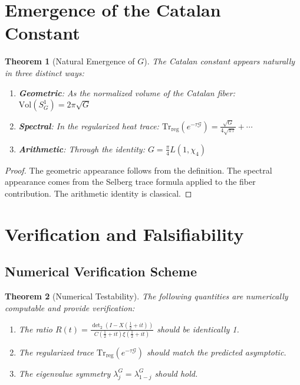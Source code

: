 \documentclass[11pt]{article}
\theoremstyle{plain}
\newtheorem{theorem}{Theorem}[section]
\theoremstyle{remark}
\newcommand{\Vol}{\mathrm{Vol}}
\newcommand{\Tr}{\mathrm{Tr}}
\newcommand{\dettwo}{\det\nolimits_2}
\newcommand{\cG}{\mathcal{G}}
\newcommand{\Catalan}{G}
\begin{document}
\section{Emergence of the Catalan Constant}

\begin{theorem}[Natural Emergence of $\Catalan$]
The Catalan constant appears naturally in three distinct ways:
\begin{enumerate}
\item \textbf{Geometric}: As the normalized volume of the Catalan fiber: $\Vol(S^1_{\Catalan}) = 2\pi\sqrt{\Catalan}$
\item \textbf{Spectral}: In the regularized heat trace: $\Tr_{\text{reg}}(e^{-\tau\cG}) = \frac{\sqrt{\Catalan}}{4\sqrt{\pi\tau}} + \cdots$
\item \textbf{Arithmetic}: Through the identity: $\Catalan = \frac{\pi}{4} L(1,\chi_4)$
\end{enumerate}
\end{theorem}

\begin{proof}
The geometric appearance follows from the definition. The spectral appearance comes from the Selberg trace formula applied to the fiber contribution. The arithmetic identity is classical.
\end{proof}

\section{Verification and Falsifiability}

\subsection{Numerical Verification Scheme}

\begin{theorem}[Numerical Testability]
The following quantities are numerically computable and provide verification:
\begin{enumerate}
\item The ratio $R(t) = \frac{\dettwo(I - X(\tfrac12 + it))}{C(\tfrac12 + it)\xi(\tfrac12 + it)}$ should be identically 1.
\item The regularized trace $\Tr_{\text{reg}}(e^{-\tau\cG})$ should match the predicted asymptotic.
\item The eigenvalue symmetry $\lambda_j^{\Catalan} = \lambda_{1-j}^{\Catalan}$ should hold.
\end{enumerate}
\end{theorem}
\end{document}
